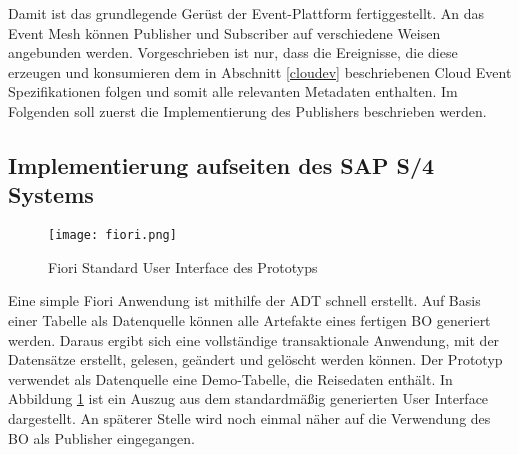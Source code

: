   Damit ist das grundlegende Gerüst der Event-Plattform fertiggestellt. An das Event Mesh können Publisher und Subscriber auf verschiedene Weisen angebunden werden. Vorgeschrieben ist nur, dass die Ereignisse, die diese erzeugen und konsumieren dem in Abschnitt \ref{cloudev} beschriebenen Cloud Event Spezifikationen folgen und somit alle relevanten Metadaten enthalten. Im Folgenden soll zuerst die Implementierung des Publishers beschrieben werden.

  \subsection{Implementierung aufseiten des SAP S/4 Systems}
  \begin{figure}
    \centering
    \texttt{[image: fiori.png]}
    \caption[Fiori Standard User Interface des Prototyps]{Fiori Standard User Interface des Prototyps \footnotemark}
    \label{fiori}
  \end{figure}
  Eine simple Fiori Anwendung ist mithilfe der \ac{ADT} schnell erstellt. Auf Basis einer Tabelle als Datenquelle können alle Artefakte eines fertigen \ac{BO} generiert werden. Daraus ergibt sich eine vollständige transaktionale Anwendung, mit der Datensätze erstellt, gelesen, geändert und gelöscht werden können. Der Prototyp verwendet als Datenquelle eine Demo-Tabelle, die Reisedaten enthält. In Abbildung \ref{fiori} ist ein Auszug aus dem standardmäßig generierten User Interface dargestellt. An späterer Stelle wird noch einmal näher auf die Verwendung des \ac{BO} als Publisher eingegangen.\\

